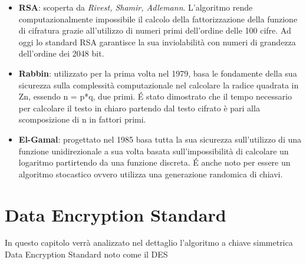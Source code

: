 \documentclass[11pt, a4paper, oneside]{Thesis} %
\begin{document}
\begin{itemize}
 \item \textbf{RSA}: scoperta da \emph{Rivest, Shamir, Adlemann}. L'algoritmo rende computazionalmente impossibile il calcolo della fattorizzazione della funzione di cifratura grazie all'utilizzo di 
 numeri primi dell'ordine delle 100 cifre. Ad oggi lo standard RSA garantisce la sua inviolabilità con numeri di grandezza dell'ordine dei 2048 bit.
 \item \textbf{Rabbin}: utilizzato per la prima volta nel 1979, basa le fondamente della sua sicurezza sulla complessità computazionale nel calcolare la radice quadrata in Zn, essendo
 n = p*q, due primi. \'E stato dimostrato che il tempo necessario per calcolare il testo in chiaro partendo dal testo cifrato è pari alla scomposizione di n in fattori primi. 
 \item \textbf{El-Gamal}: progettato nel 1985 basa tutta la sua sicurezza sull'utilizzo di una funzione unidirezionale a sua volta basata sull'impossibilità di calcolare un logaritmo partirtendo
 da una funzione discreta. \'E anche noto per essere un algoritmo stocastico ovvero utilizza una generazione randomica di chiavi.
\end{itemize}


\chapter{Data Encryption Standard}
In questo capitolo verrà analizzato nel dettaglio l'algoritmo a chiave simmetrica Data Encryption Standard noto come il DES
\end{document}
